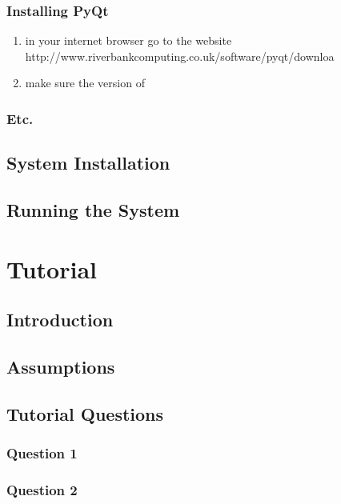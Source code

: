 \subsubsection{Installing PyQt}
\begin{enumerate}
\item in your internet browser go to the website\newline
http://www.riverbankcomputing.co.uk/software/pyqt/downloa
\item make sure the version of 

\end{enumerate}
\subsubsection{Etc.}

\subsection{System Installation}

\subsection{Running the System}

\section{Tutorial}

\subsection{Introduction}

\subsection{Assumptions}

\subsection{Tutorial Questions}

\subsubsection{Question 1}

\subsubsection{Question 2}

